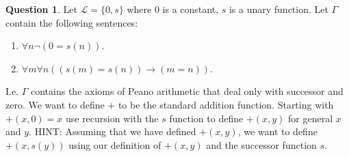 \documentclass{article}
\theoremstyle{definition}
\newtheorem{Q}{Question}
\newcommand{\ra}{\rightarrow}
\begin{document}
\begin{Q}
Let $\mathscr{L}=\{0,s\}$ where $0$ is a constant, $s$ is a unary function. Let $\Gamma$ contain the following sentences:
\begin{enumerate}
\item $\forall n \neg (0 =s(n))$.
\item $\forall m\forall n((s(m)=s(n))\ra (m =n))$.
\end{enumerate}
I.e. $\Gamma$ contains the axioms of Peano arithmetic that deal only with successor and zero. We want to define $+$ to be the standard addition function. Starting with $+(x,0)=x$ use recursion with the $s$ function to define $+(x,y)$ for general $x$ and $y$. HINT: Assuming that we have defined $+(x,y)$, we want to define $+(x,s(y))$ using our definition of $+(x,y)$ and the successor function $s$. 
\end{Q}
\begin{comment}
\textbf{Solution} 
\begin{itemize}
\item $+(x,0) = x$.
\item $+(x,s(y)) = s(+(x,y))$.
\end{itemize}
\end{comment}
\end{document}
